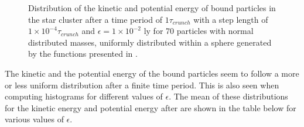 \begin{figure}[H]
\begin{minipage}{.5\textwidth}
\end{minipage}
\caption{
	Distribution of the kinetic and potential energy of bound particles in the star cluster after a time period of $1\tau_{crunch}$ with a step length of $1\times 10^{-4} \tau_{crunch}$ and $\epsilon = 1\times 10^{-2} \text{ ly}$ for 70 particles with normal distributed masses, uniformly distributed within a sphere generated by the functions presented in . 
}
\label{fig:DistributionPotKinEnBoundHistograms}
\end{figure}
The kinetic and the potential energy of the bound particles seem to follow a more or less uniform distribution after a finite time period. 
This is also seen when computing histograms for different values of $\epsilon$. 
The mean of these distributions for the kinetic energy and potential energy after are shown in the table below for various values of $\epsilon$. 

